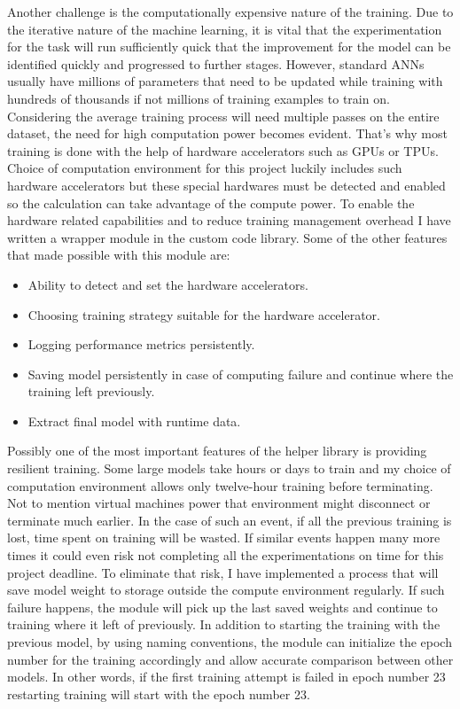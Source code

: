 Another challenge is the computationally expensive nature of the training.
Due to the iterative nature of the machine learning, it is vital that the experimentation for the task will run sufficiently quick that the improvement for the model can be identified quickly and progressed to further stages. 
However, standard ANNs usually have millions of parameters that need to be updated while training with hundreds of thousands if not millions of training examples to train on. 
Considering the average training process will need multiple passes on the entire dataset, the need for high computation power becomes evident.
That's why most training is done with the help of hardware accelerators such as GPUs or TPUs.
Choice of computation environment for this project luckily includes such hardware accelerators but these special hardwares must be detected and enabled so the calculation can take advantage of the compute power.
To enable the hardware related capabilities and to reduce training management overhead I have written a wrapper module in the custom code library.
Some of the other features that made possible with this module are:

\begin{itemize}
  \item Ability to detect and set the hardware accelerators.
  \item Choosing training strategy suitable for the hardware accelerator.
  \item Logging performance metrics persistently.
  \item Saving model persistently in case of computing failure and continue where the training left previously.
  \item Extract final model with runtime data.
\end{itemize}
 
Possibly one of the most important features of the helper library is providing resilient training. 
Some large models take hours or days to train and my choice of computation environment allows only twelve-hour training before terminating. 
Not to mention virtual machines power that environment might disconnect or terminate much earlier. 
In the case of such an event, if all the previous training is lost, time spent on training will be wasted. 
If similar events happen many more times it could even risk not completing all the experimentations on time for this project deadline. 
To eliminate that risk, I have implemented a process that will save model weight to storage outside the compute environment regularly. 
If such failure happens, the module will pick up the last saved weights and continue to training where it left of previously.
In addition to starting the training with the previous model, by using naming conventions, the module can initialize the epoch number for the training accordingly and allow accurate comparison between other models. 
In other words, if the first training attempt is failed in epoch number 23 restarting training will start with the epoch number 23.

\clearpage
